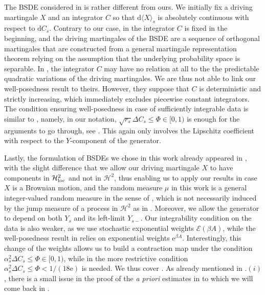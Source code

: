 \documentclass[10pt]{article} %
\newcommand\cE{\mathcal E}
\newcommand\cH{\mathcal H}
\newcommand{\1}{\mathbf{1}}
\def\d{\mathrm{d}}
\begin{document}
\medskip
The BSDE considered in \cite{cohen2012existence} is rather different from ours. We initially fix a driving martingale $X$ and an integrator $C$ so that $\d\langle X \rangle_s$ is absolutely continuous with respect to $\d C_s$. Contrary to our case, in \cite{cohen2012existence} the integrator $C$ is fixed in the beginning, and the driving martingales of the BSDE are a sequence of orthogonal martingales that are constructed from a general martingale representation theorem relying on the assumption that the underlying probability space is separable. In \cite{cohen2012existence}, the integrator $C$ may have no relation at all to the the predictable quadratic variations of the driving martingales. We are thus not able to link our well-posedness result to theirs. However, they suppose that $C$ is deterministic and strictly increasing, which immediately excludes piecewise constant integrators. The condition ensuring well-posedness in case of sufficiently integrable data is similar to \cite{bandini2015existence}, namely, in our notation, $\sqrt{r_s}\Delta C_s \leq \Phi \in[0,1)$ is enough for the arguments to go through, see \cite[Lemma 5.5 and Theorem 6.1]{cohen2012existence}. This again only involves the Lipschitz coefficient with respect to the $Y$-component of the generator. 

\medskip
Lastly, the formulation of BSDEs we chose in this work already appeared in \cite{papapantoleon2018existence}, with the slight difference that we allow our driving martingale $X$ to have components in $\cH^2_\text{\rm loc}$ and not in $\cH^2$, thus enabling us to apply our results in case $X$ is a Brownian motion, and the random measure $\mu$ in this work is a general integer-valued random measure in the sense of \cite{jacod1979calcul,jacod2003limit}, which is not necessarily induced by the jump measure of a process in $\cH^2$ as in \cite{papapantoleon2018existence}. Moreover, we allow the generator to depend on both $Y_s$ and its left-limit $Y_{s-}$. Our integrability condition on the data is also weaker, as we use stochastic exponential weights $\cE(\beta A)$, while the well-posedness result in \cite{papapantoleon2018existence} relies on exponential weights $\mathrm{e}^{\beta A}$. Interestingly, this change of the weights allows us to build a contraction map under the condition $\alpha^2_s \Delta C_s \leq \Phi \in [0,1) $, while in \cite{papapantoleon2018existence} the more restrictive condition $\alpha^2_s \Delta C_s \leq \Phi < 1/(18\mathrm{e})$ is needed. We thus cover \cite[Theorem 3.5]{papapantoleon2018existence}. As already mentioned in .$(i)$, there is a small issue in the proof of the \emph{a priori} estimates in \cite{papapantoleon2018existence} to which we will come back in .
\end{document}
